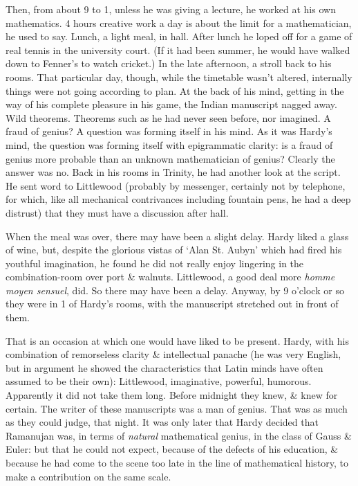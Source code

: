 \documentclass{article}
\numberwithin{equation}{section}
\begin{document}
Then, from about 9 to 1, unless he was giving a lecture, he worked at his own mathematics. 4 hours creative work a day is about the limit for a mathematician, he used to say. Lunch, a light meal, in hall. After lunch he loped off for a game of real tennis in the university court. (If it had been summer, he would have walked down to Fenner's to watch cricket.) In the late afternoon, a stroll back to his rooms. That particular day, though, while the timetable wasn't altered, internally things were not going according to plan. At the back of his mind, getting in the way of his complete pleasure in his game, the Indian manuscript nagged away. Wild theorems. Theorems such as he had never seen before, nor imagined. A fraud of genius? A question was forming itself in his mind. As it was Hardy's mind, the question was forming itself with epigrammatic clarity: is a fraud of genius more probable than an unknown mathematician of genius? Clearly the answer was no. Back in his rooms in Trinity, he had another look at the script. He sent word to Littlewood (probably by messenger, certainly not by telephone, for which, like all mechanical contrivances including fountain pens, he had a deep distrust) that they must have a discussion after hall.

When the meal was over, there may have been a slight delay. Hardy liked a glass of wine, but, despite the glorious vistas of `Alan St. Aubyn' which had fired his youthful imagination, he found he did not really enjoy lingering in the combination-room over port \& walnuts. Littlewood, a good deal more \textit{homme moyen sensuel}, did. So there may have been a delay. Anyway, by 9 o'clock or so they were in 1 of Hardy's rooms, with the manuscript stretched out in front of them.

That is an occasion at which one would have liked to be present. Hardy, with his combination of remorseless clarity \& intellectual panache (he was very English, but in argument he showed the characteristics that Latin minds have often assumed to be their own): Littlewood, imaginative, powerful, humorous. Apparently it did not take them long. Before midnight they knew, \& knew for certain. The writer of these manuscripts was a man of genius. That was as much as they could judge, that night. It was only later that Hardy decided that Ramanujan was, in terms of \textit{natural} mathematical genius, in the class of Gauss \& Euler: but that he could not expect, because of the defects of his education, \& because he had come to the scene too late in the line of mathematical history, to make a contribution on the same scale.
\end{document}
